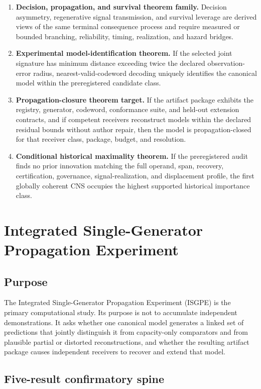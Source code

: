 \documentclass[11pt]{article}
\begin{document}
\begin{enumerate}
\item \textbf{Decision, propagation, and survival theorem family.} Decision asymmetry, regenerative signal transmission, and survival leverage are derived views of the same terminal consequence process and require measured or bounded branching, reliability, timing, realization, and hazard bridges.
\item \textbf{Experimental model-identification theorem.} If the selected joint signature has minimum distance exceeding twice the declared observation-error radius, nearest-valid-codeword decoding uniquely identifies the canonical model within the preregistered candidate class.
\item \textbf{Propagation-closure theorem target.} If the artifact package exhibits the registry, generator, codeword, conformance suite, and held-out extension contracts, and if competent receivers reconstruct models within the declared residual bounds without author repair, then the model is propagation-closed for that receiver class, package, budget, and resolution.
\item \textbf{Conditional historical maximality theorem.} If the preregistered audit finds no prior innovation matching the full operand, span, recovery, certification, governance, signal-realization, and displacement profile, the first globally coherent CNS occupies the highest supported historical importance class.
\end{enumerate}

\section{Integrated Single-Generator Propagation Experiment}

\subsection{Purpose}

The Integrated Single-Generator Propagation Experiment (ISGPE) is the primary computational study. Its purpose is not to accumulate independent demonstrations. It asks whether one canonical model generates a linked set of predictions that jointly distinguish it from capacity-only comparators and from plausible partial or distorted reconstructions, and whether the resulting artifact package causes independent receivers to recover and extend that model.

\subsection{Five-result confirmatory spine}
\end{document}
